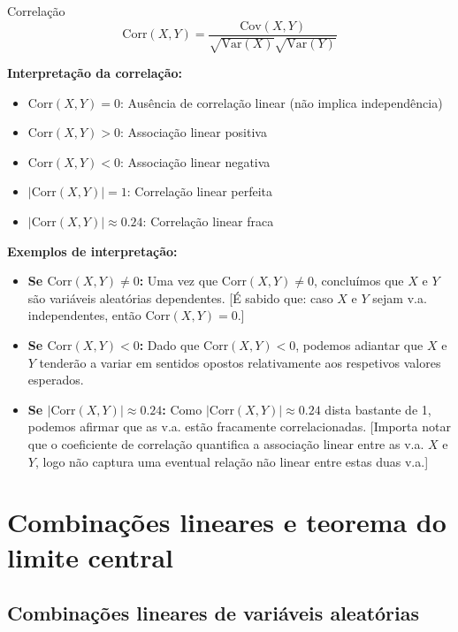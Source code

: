 \documentclass[a4paper,12pt]{article}
\begin{document}
\begin{formulabox}{Correlação}
\begin{equation}\label{formula21}\tag{Fórmula 21}
    \mathrm{Corr}(X, Y) = \frac{\mathrm{Cov}(X, Y)}{\sqrt{\mathrm{Var}(X)} \sqrt{\mathrm{Var}(Y)}}
\end{equation}

\textbf{Interpretação da correlação:}
\begin{itemize}
    \item $\mathrm{Corr}(X, Y) = 0$: Ausência de correlação linear (não implica independência)
    \item $\mathrm{Corr}(X, Y) > 0$: Associação linear positiva
    \item $\mathrm{Corr}(X, Y) < 0$: Associação linear negativa
    \item $|\mathrm{Corr}(X, Y)| = 1$: Correlação linear perfeita
    \item $|\mathrm{Corr}(X, Y)| \approx 0.24$: Correlação linear fraca
\end{itemize}

\textbf{Exemplos de interpretação:}
\begin{itemize}
    \item \textbf{Se $\mathrm{Corr}(X, Y) \neq 0$:} Uma vez que $\mathrm{Corr}(X, Y) \neq 0$, concluímos que $X$ e $Y$ são variáveis aleatórias dependentes. [É sabido que: caso $X$ e $Y$ sejam v.a. independentes, então $\mathrm{Corr}(X, Y) = 0$.]
    \item \textbf{Se $\mathrm{Corr}(X, Y) < 0$:} Dado que $\mathrm{Corr}(X, Y) < 0$, podemos adiantar que $X$ e $Y$ tenderão a variar em sentidos opostos relativamente aos respetivos valores esperados.
    \item \textbf{Se $|\mathrm{Corr}(X, Y)| \approx 0.24$:} Como $|\mathrm{Corr}(X, Y)| \approx 0.24$ dista bastante de 1, podemos afirmar que as v.a. estão fracamente correlacionadas. [Importa notar que o coeficiente de correlação quantifica a associação linear entre as v.a. $X$ e $Y$, logo não captura uma eventual relação não linear entre estas duas v.a.]
\end{itemize}
\end{formulabox}

\newpage

\section{\color{sectioncolor}Combinações lineares e teorema do limite central}
\subsection{Combinações lineares de variáveis aleatórias}
\end{document}
